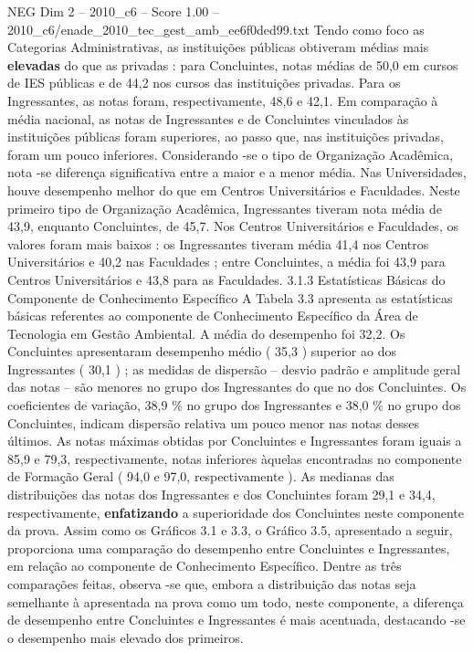 \begin{textsample}{NEG Dim 2 – 2010\_c6 – Score 1.00 – 2010\_c6/enade\_2010\_tec\_gest\_amb\_ee6f0ded99.txt}
Tendo como foco as Categorias Administrativas, as instituições públicas obtiveram médias mais \textbf{elevadas} do que as privadas : para Concluintes, notas médias de 50,0 em cursos de IES públicas e de 44,2 nos cursos das instituições privadas.
Para os Ingressantes, as notas foram, respectivamente, 48,6 e 42,1.
Em comparação à média nacional, as notas de Ingressantes e de Concluintes vinculados às instituições públicas foram superiores, ao passo que, nas instituições privadas, foram um pouco inferiores.
Considerando -se o tipo de Organização Acadêmica, nota -se diferença significativa entre a maior e a menor média.
Nas Universidades, houve desempenho melhor do que em Centros Universitários e Faculdades.
Neste primeiro tipo de Organização Acadêmica, Ingressantes tiveram nota média de 43,9, enquanto Concluintes, de 45,7.
Nos Centros Universitários e Faculdades, os valores foram mais baixos : os Ingressantes tiveram média 41,4 nos Centros Universitários e 40,2 nas Faculdades ; entre Concluintes, a média foi 43,9 para Centros Universitários e 43,8 para as Faculdades. 3.1.3 Estatísticas Básicas do Componente de Conhecimento Específico A Tabela 3.3 apresenta as estatísticas básicas referentes ao componente de Conhecimento Específico da Área de Tecnologia em Gestão Ambiental.
A média do desempenho foi 32,2.
Os Concluintes apresentaram desempenho médio ( 35,3 ) superior ao dos Ingressantes ( 30,1 ) ; as medidas de dispersão – desvio padrão e amplitude geral das notas – são menores no grupo dos Ingressantes do que no dos Concluintes.
Os coeficientes de variação, 38,9 \% no grupo dos Ingressantes e 38,0 \% no grupo dos Concluintes, indicam dispersão relativa um pouco menor nas notas desses últimos.
As notas máximas obtidas por Concluintes e Ingressantes foram iguais a 85,9 e 79,3, respectivamente, notas inferiores àquelas encontradas no componente de Formação Geral ( 94,0 e 97,0, respectivamente ).
As medianas das distribuições das notas dos Ingressantes e dos Concluintes foram 29,1 e 34,4, respectivamente, \textbf{enfatizando} a superioridade dos Concluintes neste componente da prova.
Assim como os Gráficos 3.1 e 3.3, o Gráfico 3.5, apresentado a seguir, proporciona uma comparação do desempenho entre Concluintes e Ingressantes, em relação ao componente de Conhecimento Específico.
Dentre as três comparações feitas, observa -se que, embora a distribuição das notas seja semelhante à apresentada na prova como um todo, neste componente, a diferença de desempenho entre Concluintes e Ingressantes é mais acentuada, destacando -se o desempenho mais elevado dos primeiros.

\end{textsample}
